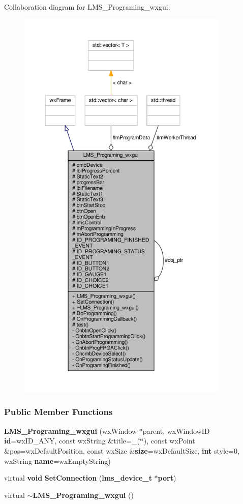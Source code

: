Collaboration diagram for L\+M\+S\+\_\+\+Programing\+\_\+wxgui\+:
\nopagebreak
\begin{figure}[H]
\begin{center}
\leavevmode
\includegraphics[height=550pt]{dc/dd0/classLMS__Programing__wxgui__coll__graph}
\end{center}
\end{figure}
\subsubsection*{Public Member Functions}
\begin{DoxyCompactItemize}
\item 
{\bf L\+M\+S\+\_\+\+Programing\+\_\+wxgui} (wx\+Window $\ast$parent, wx\+Window\+ID {\bf id}=wx\+I\+D\+\_\+\+A\+NY, const wx\+String \&title=\+\_\+(\char`\"{}\char`\"{}), const wx\+Point \&pos=wx\+Default\+Position, const wx\+Size \&{\bf size}=wx\+Default\+Size, {\bf int} style=0, wx\+String {\bf name}=wx\+Empty\+String)
\item 
virtual {\bf void} {\bf Set\+Connection} ({\bf lms\+\_\+device\+\_\+t} $\ast${\bf port})
\item 
virtual {\bf $\sim$\+L\+M\+S\+\_\+\+Programing\+\_\+wxgui} ()
\end{DoxyCompactItemize}
